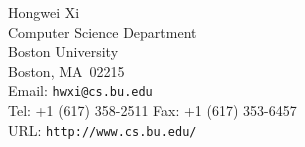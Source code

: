 \documentclass{article}
\begin{document}
\def\namefont{\Large\bf}
\def\itemfont{\Large\sc}

\newdimen\leftdim
\leftdim=108pt

\newdimen\rightdim
\rightdim=324pt

\newdimen\wholedim
\wholedim=432pt

\newdimen\middim
\middim=12pt

\newdimen\smalldim
\smalldim=2pt

\begin{center}
{\Large\sc Hongwei Xi} \\[6pt]
Computer Science Department \\
Boston University \\
Boston, MA~02215 \\
Email: {\tt hwxi@cs.bu.edu} \\
Tel: +1 (617) 358-2511 \kern12pt Fax: +1 (617) 353-6457 \\
URL: {\tt http://www.cs.bu.edu/} \\
\end{center}
\end{document}
